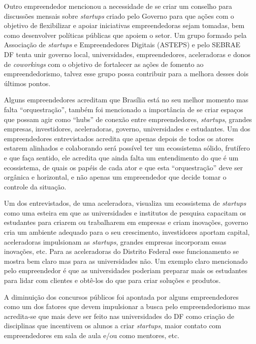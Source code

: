 Outro empreendedor mencionou a necessidade de se criar um conselho para discussões mensais sobre \textit{startups} criado pelo Governo para que ações com o objetivo de flexibilizar e apoiar iniciativas empreendedoras sejam tomadas, bem como desenvolver políticas públicas que apoiem o setor. Um grupo formado pela Associação de \textit{startups} e Empreendedores Digitais (ASTEPS) e pelo SEBRAE DF tenta unir governo local, universidades, empreendedores, aceleradoras e donos de \textit{coworkings} com o objetivo de fortalecer as ações de fomento ao empreendedorismo, talvez esse grupo possa contribuir para a melhora desses  dois últimos pontos.

Alguns empreendedores acreditam que Brasília está no seu melhor momento mas falta ``orquestração'', também foi mencionado a importância de se criar espaços que possam agir como ``hubs'' de conexão entre empreendedores, \textit{startups}, grandes empresas, investidores, aceleradoras, governo, universidades e estudantes. Um dos empreendedores entrevistados acredita que apenas depois de todos os atores estarem alinhados e colaborando será possível ter um ecossistema sólido, frutífero e que faça sentido, ele acredita que ainda falta um entendimento do que é um ecossistema, de quais os papéis de cada ator e que esta ``orquestração'' deve ser orgânica e horizontal, e não apenas um empreendedor que decide tomar o controle da situação. 

Um dos entrevistados, de uma aceleradora, visualiza um ecossistema de \textit{startups} como uma esteira em que as universidades e institutos de pesquisa capacitam os estudantes para criarem ou trabalharem em empresas e criam inovações, governo cria um ambiente adequado para o seu crescimento, investidores aportam capital, aceleradoras impulsionam as \textit{startups}, grandes empresas incorporam essas inovações, etc. Para as aceleradoras do Distrito Federal esse funcionamento se mostra bem claro mas para as universidades não. Um exemplo claro mencionado pelo empreendedor é que as universidades poderiam preparar mais os estudantes para lidar com clientes e obtê-los do que para criar soluções e produtos.

A diminuição dos concursos públicos foi apontada por alguns empreendedores como um dos fatores que devem impulsionar a busca pelo empreendedorismo mas acredita-se que mais deve ser feito nas universidades do DF como criação de disciplinas que incentivem os alunos a criar \textit{startups}, maior contato com empreendedores em sala de aula e/ou como mentores, etc.

